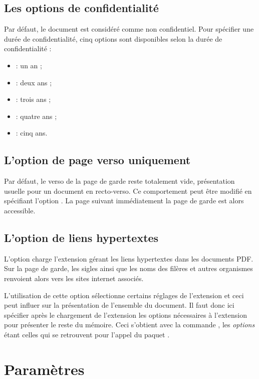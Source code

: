 \subsection{Les options de confidentialité}

Par défaut, le document est considéré comme non confidentiel. Pour spécifier une durée de confidentialité, cinq options sont disponibles selon la durée de confidentialité : 
\begin{itemize}
\item {} : un an ;
\item {} : deux ans ;
\item {} : trois ans ;
\item {} : quatre ans ;
\item {} : cinq ans.
\end{itemize}


\subsection{L'option de page verso uniquement}

Par défaut, le verso de la page de garde reste totalement vide, présentation usuelle pour un document en recto-verso. Ce comportement peut être modifié en spécifiant l'option . La page suivant immédiatement la page de garde est alors accessible.


\subsection{L'option de liens hypertextes}

L'option  charge l'extension  gérant les liens hypertextes dans les documents PDF. Sur la page de garde, les sigles ainsi que les noms des filères et autres organismes renvoient alors vers les sites internet associés.

L'utilisation de cette option sélectionne certains réglages de l'extension  et ceci peut influer sur la présentation de l'ensemble du document. Il faut donc ici spécifier après le chargement de l'extension  les options nécessaires à l'extension  pour présenter le reste du mémoire. Ceci s'obtient avec la  commande , les \emph{options} étant celles qui se retrouvent pour l'appel du paquet .

\section{Paramètres}

